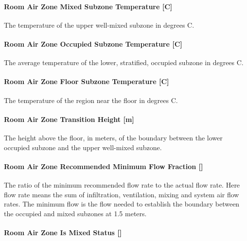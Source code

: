 \paragraph{Room Air Zone Mixed Subzone Temperature {[}C{]}}\label{room-air-zone-mixed-subzone-temperature-c}

The temperature of the upper well-mixed subzone in degrees C.

\paragraph{Room Air Zone Occupied Subzone Temperature {[}C{]}}\label{room-air-zone-occupied-subzone-temperature-c}

The average temperature of the lower, stratified, occupied subzone in degrees C.

\paragraph{Room Air Zone Floor Subzone Temperature {[}C{]}}\label{room-air-zone-floor-subzone-temperature-c}

The temperature of the region near the floor in degrees C.

\paragraph{Room Air Zone Transition Height {[}m{]}}\label{room-air-zone-transition-height-m}

The height above the floor, in meters, of the boundary between the lower occupied subzone and the upper well-mixed subzone.

\paragraph{Room Air Zone Recommended Minimum Flow Fraction {[]}}\label{room-air-zone-recommended-minimum-flow-fraction}

The ratio of the minimum recommended flow rate to the actual flow rate. Here flow rate means the sum of infiltration, ventilation, mixing and system air flow rates. The minimum flow is the flow needed to establish the boundary between the occupied and mixed subzones at 1.5 meters.

\paragraph{Room Air Zone Is Mixed Status {[]}}\label{room-air-zone-is-mixed-status}

